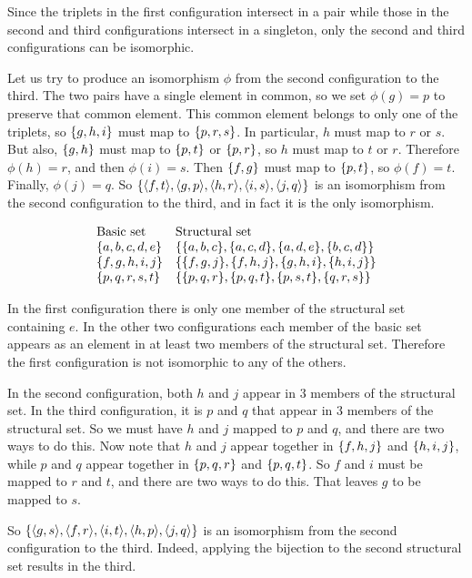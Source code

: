 \begin{solution}
Since the triplets in the first configuration intersect in a pair while those in the second
and third configurations intersect in a singleton, only the second and third configurations
can be isomorphic.

Let us try to produce an isomorphism $\phi$ from the second configuration to the third.
The two pairs have a single element in common, so we set $\phi(g)=p$ to preserve that common element.
This common element belongs to only one of the triplets, so $\left\{g,h,i\right\}$ must map to $\left\{p,r,s\right\}$.
In particular, $h$ must map to $r$ or $s$. But also, $\left\{g,h\right\}$ must map to $\left\{p,t\right\}$ or $\left\{p,r\right\}$,
so $h$ must map to $t$ or $r$. Therefore $\phi(h)=r$, and then $\phi(i)=s$.
Then $\left\{f,g\right\}$ must map to $\left\{p,t\right\}$, so $\phi(f)=t$. Finally, $\phi(j)=q$.
So $\set{\aprn{f,t},\aprn{g,p},\aprn{h,r},\aprn{i,s},\aprn{j,q}}$ is an isomorphism
from the second configuration to the third, and in fact it is the only isomorphism.
\end{solution}

\begin{exercise}
\[
\begin{array}{ll}
    \text{Basic set} & \text{Structural set}\\
    \set{a,b,c,d,e} & \set{\set{a,b,c},\set{a,c,d},\set{a,d,e},\set{b,c,d}}\\
    \set{f,g,h,i,j} & \set{\set{f,g,j},\set{f,h,j},\set{g,h,i},\set{h,i,j}}\\
    \set{p,q,r,s,t} & \set{\set{p,q,r},\set{p,q,t},\set{p,s,t},\set{q,r,s}}
\end{array}
\]
\end{exercise}

\begin{solution}
In the first configuration there is only one member of the structural set containing $e$.
In the other two configurations each member of the basic set appears as an element in
at least two members of the structural set. Therefore the first configuration is not isomorphic
to any of the others.

In the second configuration, both $h$ and $j$ appear in 3 members of the structural set.
In the third configuration, it is $p$ and $q$ that appear in 3 members of the structural set.
So we must have $h$ and $j$ mapped to $p$ and $q$, and there are two ways to do this.
Now note that $h$ and $j$ appear together in $\left\{f,h,j\right\}$ and $\left\{h,i,j\right\}$, while $p$ and $q$
appear together in $\left\{p,q,r\right\}$ and $\left\{p,q,t\right\}$.
So $f$ and $i$ must be mapped to $r$ and $t$, and there are two ways to do this.
That leaves $g$ to be mapped to $s$.

So $\set{\aprn{g,s},\aprn{f,r},\aprn{i,t},\aprn{h,p},\aprn{j,q}}$ is an isomorphism
from the second configuration to the third. Indeed, applying the bijection to
the second structural set results in the third.
\end{solution}


